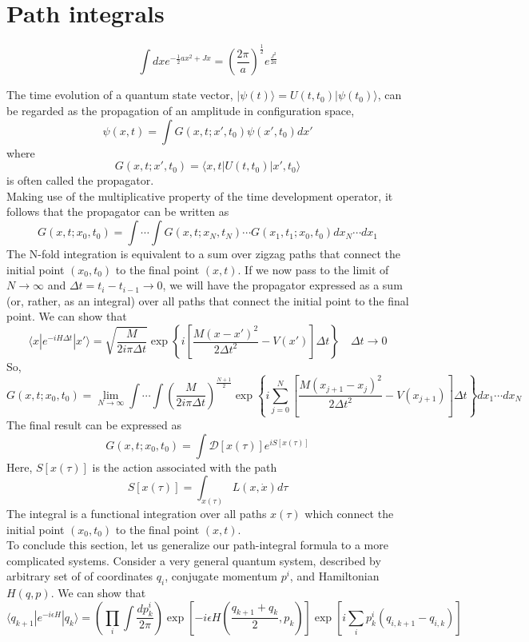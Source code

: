 \documentclass[cyan]{elegantnote}
\begin{document}
\section{Path integrals}
\begin{newthem}
\[\int dx e^{-\frac{1}{2} ax^2 + Jx} = \left( \frac{2\pi}{a}\right)^{\frac{1}{2}} e^{\frac{J^2}{2a}}\]
\end{newthem}
The time evolution of a quantum state vector, $|\psi(t)\rangle = U(t,t_0)| \psi(t_0)\rangle$, can be regarded as the propagation of an amplitude in configuration space,
\[\psi(x,t) = \int G(x,t;x',t_0) \psi(x',t_0)dx'\]
where
\[G(x,t;x',t_0) = \langle x,t | U(t,t_0) | x',t_0 \rangle\]
is often called the propagator. \\
Making use of the multiplicative property of the time development operator, it follows that the propagator can be written as
\[G(x,t;x_0,t_0) = \int \cdots \int G(x,t;x_N,t_N) \cdots G(x_1,t_1;x_0,t_0) dx_N \cdots dx_1\]
The N-fold integration is equivalent to a sum over zigzag paths that connect the initial point $(x_0,t_0)$ to the final point $(x,t)$. If we now pass to the limit of $N \to \infty$ and $\Delta t = t_i - t_{i-1} \to 0$, we will have the propagator expressed as a sum (or, rather, as an integral) over all paths
that connect the initial point to the final point.
We can show that
\[\langle x | e^{-iH \Delta t} | x' \rangle = \sqrt{\frac{M}{2i\pi\Delta t}} \exp \left\{ i\left[ \frac{M(x-x')^2}{2\Delta t^2}   -V(x') \right] \Delta t \right\} \quad \Delta t \to 0 \]
So,
\[G(x,t;x_0,t_0) = \lim_{N \to \infty} \int \cdots \int \left(\frac{M}{2i\pi\Delta t}\right)^{\frac{N+1}{2}} \exp \left\{ i \sum_{j=0}^{N}\left[ \frac{M(x_{j+1}-x_{j})^2}{2\Delta t^2}   -V(x_{j+1}) \right] \Delta t \right\} dx_1 \cdots dx_N\]
The final result can be expressed as
\[G(x,t;x_0,t_0) = \int \mathcal{D}[x(\tau)] e^{iS[x(\tau)]}\]
Here, $S[x(\tau)]$ is the action associated with the path
\[S[x(\tau)] = \int_{x(\tau)} L(x,\dot{x}) d\tau\]
The integral is a functional integration over all paths $x(\tau)$ which connect the initial point $(x_0,t_0)$ to the final point $(x,t)$.\\
To conclude this section, let us generalize our path-integral formula to a more complicated systems. Consider a very general quantum system, described by arbitrary set of of coordinates $q_i$, conjugate momentum $p^i$, and Hamiltonian $H(q,p)$. 
We can show that
\[\langle q_{k+1} | e^{-i\epsilon H} | q_{k}\rangle = \left( \prod_i \int \frac{dp^i_k}{2\pi}\right) \exp \left[ -i\epsilon H \left( \frac{q_{k+1}+q_{k}}{2},p_k\right) \right] \exp \left[ i \sum_i p_k^i (q_{i,k+1} - q_{i,k})\right] \] 
\end{document}
